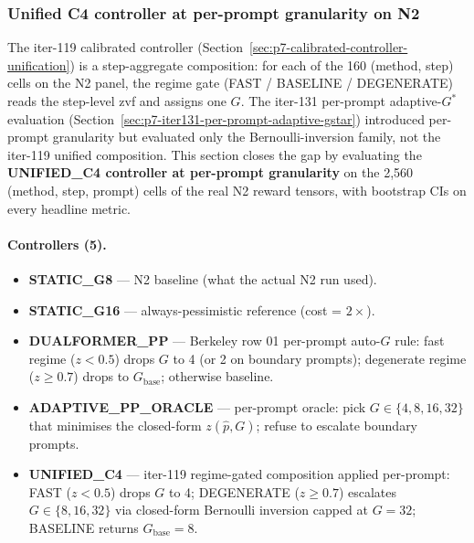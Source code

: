 %

\subsubsection{Unified C4 controller at per-prompt granularity on N2}
\label{sec:p7-iter147-unified-per-prompt}

The iter-119 calibrated controller (Section~\ref{sec:p7-calibrated-controller-unification})
is a step-aggregate composition: for each of the 160 (method, step) cells on the N2 panel,
the regime gate (FAST / BASELINE / DEGENERATE) reads the step-level zvf and assigns one $G$.
The iter-131 per-prompt adaptive-$G^*$ evaluation (Section~\ref{sec:p7-iter131-per-prompt-adaptive-gstar})
introduced per-prompt granularity but evaluated only the Bernoulli-inversion family, not the
iter-119 unified composition. This section closes the gap by evaluating the
\textbf{UNIFIED\_C4 controller at per-prompt granularity} on the 2,560
(method, step, prompt) cells of the real N2 reward tensors, with bootstrap
CIs on every headline metric.

\paragraph{Controllers (5).}

\begin{itemize}
\item \textbf{STATIC\_G8} --- N2 baseline (what the actual N2 run used).
\item \textbf{STATIC\_G16} --- always-pessimistic reference (cost = $2\times$).
\item \textbf{DUALFORMER\_PP} --- Berkeley row 01 per-prompt auto-$G$ rule:
      fast regime ($z<0.5$) drops $G$ to 4 (or 2 on boundary prompts);
      degenerate regime ($z\geq 0.7$) drops to $G_{\mathrm{base}}$; otherwise baseline.
\item \textbf{ADAPTIVE\_PP\_ORACLE} --- per-prompt oracle: pick $G \in \{4,8,16,32\}$
      that minimises the closed-form $z(\hat p, G)$; refuse to escalate boundary prompts.
\item \textbf{UNIFIED\_C4} --- iter-119 regime-gated composition applied per-prompt:
      FAST ($z<0.5$) drops $G$ to 4; DEGENERATE ($z\geq 0.7$) escalates
      $G \in \{8, 16, 32\}$ via closed-form Bernoulli inversion capped at $G=32$;
      BASELINE returns $G_{\mathrm{base}}=8$.
\end{itemize}

